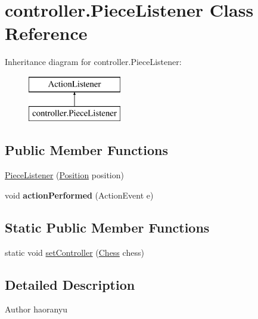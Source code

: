 \hypertarget{classcontroller_1_1_piece_listener}{\section{controller.\+Piece\+Listener Class Reference}
\label{classcontroller_1_1_piece_listener}
}
Inheritance diagram for controller.\+Piece\+Listener\+:\begin{figure}[H]
\begin{center}
\leavevmode
\includegraphics[height=2.000000cm]{classcontroller_1_1_piece_listener}
\end{center}
\end{figure}
\subsection*{Public Member Functions}
\begin{DoxyCompactItemize}
\item 
\hyperlink{classcontroller_1_1_piece_listener_ab1388dd6e4be5dc587094c462fdb3f54}{Piece\+Listener} (\hyperlink{classmodel_core_1_1_position}{Position} position)
\item 
\hypertarget{classcontroller_1_1_piece_listener_aa2b4ff19c058e937ef7d39bed4c0696f}{void {\bfseries action\+Performed} (Action\+Event e)}\label{classcontroller_1_1_piece_listener_aa2b4ff19c058e937ef7d39bed4c0696f}

\end{DoxyCompactItemize}
\subsection*{Static Public Member Functions}
\begin{DoxyCompactItemize}
\item 
static void \hyperlink{classcontroller_1_1_piece_listener_a2a573010fe4344704922793a38fdfd86}{set\+Controller} (\hyperlink{classcontroller_1_1_chess}{Chess} chess)
\end{DoxyCompactItemize}


\subsection{Detailed Description}
\begin{DoxyAuthor}{Author}
haoranyu 
\end{DoxyAuthor}


